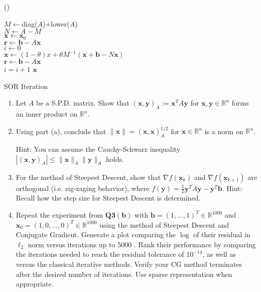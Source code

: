 \documentclass{report}
\begin{document}
\begin{solution}
	\begin{algorithm}[H]
		\Fn(){\FuncSty{)}}{
			\SetAlgoLined
			\SetNoFillComment
			\vspace{3mm}
			$M \leftarrow $diag($A$)+lower($A$) \\
			$N\leftarrow  A- M$\\
			$\bm x \leftarrow  \bm x_0$\\
			$\bm r \leftarrow \bm b-A\bm x  $\\
			$i \leftarrow 0$ \\
			  {
				$\bm x  \leftarrow (1-\theta) x + \theta M^{-1}(\bm x + \bm b - N\bm x)  $\\
				$\bm r  \leftarrow \bm b - A\bm x$ \\
				$i = i+1$
			}
			\Return $\bm x$
			\caption{SOR Iteration}
		}
	\end{algorithm}
\end{solution}
{
	\begin{enumerate}[label=(\alph*)]
		\item Let $A$ be a S.P.D. matrix. Show that $(\boldsymbol{x}, \boldsymbol{y})_A:=\boldsymbol{x}^T A \boldsymbol{y}$ for $\boldsymbol{x}, \boldsymbol{y} \in \mathbb{R}^n$ forms an inner product on $\mathbb{R}^n$.
		\item Using part (a), conclude that $\|\boldsymbol{x}\|=(\boldsymbol{x}, \boldsymbol{x})_A^{1 / 2}$ for $\boldsymbol{x} \in \mathbb{R}^n$ is a norm on $\mathbb{R}^n$.

		      Hint: You can assume the Cauchy-Schwarz inequality $\left|(\boldsymbol{x}, \boldsymbol{y})_A\right| \leq\|\boldsymbol{x}\|_A\|\boldsymbol{y}\|_A$ holds.
		\item For the method of Steepest Descent, show that $\nabla f\left(\boldsymbol{x}_k\right)$ and $\nabla f\left(\boldsymbol{x}_{k+1}\right)$ are orthogonal (i.e. zig-zaging behavior), where $f(\boldsymbol{y})=\frac{1}{2} \boldsymbol{y}^T A \boldsymbol{y}-\boldsymbol{y}^T \boldsymbol{b}$. Hint: Recall how the step size for Steepest Descent is determined.
		\item Repeat the experiment from $\mathbf{Q 3}(\mathbf{b})$ with $\boldsymbol{b}=(1, \ldots, 1)^T \in \mathbb{R}^{1000}$ and $\boldsymbol{x}_0=(1,0, \ldots, 0)^T \in \mathbb{R}^{1000}$ using the method of Steepest Descent and Conjugate Gradient. Generate a plot comparing the $\log$ of their residual in $\ell_2$ norm versus iterations up to 5000 . Rank their performance by comparing the iterations needed to reach the residual tolerance of $10^{-14}$, as well as versus the classical iterative methods. Verify your CG method terminates after the desired number of iterations. Use sparse representation when appropriate.
	\end{enumerate}
}
\end{document}
